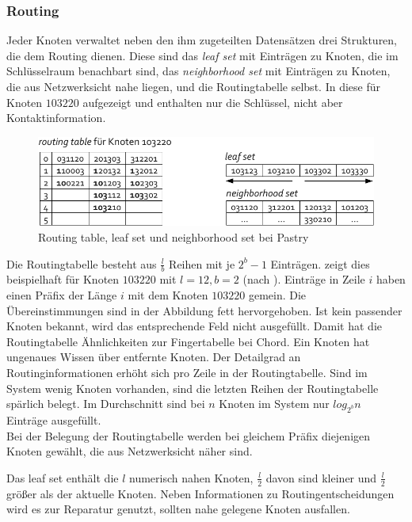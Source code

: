 \subsubsection{Routing}
Jeder Knoten verwaltet neben den ihm zugeteilten Datensätzen drei Strukturen, die dem Routing dienen. Diese sind das \emph{leaf set} mit Einträgen zu Knoten, die im Schlüsselraum benachbart sind, das \emph{neighborhood set} mit Einträgen zu Knoten, die aus Netzwerksicht nahe liegen, und die Routingtabelle selbst. In  diese für Knoten $103220$ aufgezeigt und enthalten nur die Schlüssel, nicht aber Kontaktinformation.

\begin{figure}[htbp]
\centering
\includegraphics{grafics/pastry_routing_table.pdf}
\caption{Routing table, leaf set und neighborhood set bei Pastry}
\label{fig:pastry_routing_table}
\end{figure}

Die Routingtabelle besteht aus $\frac{l}{b}$ Reihen mit je $2^b -1$ Einträgen.  zeigt dies beispielhaft für Knoten $103220$ mit $l=12, b=2$ (nach \cite{Goetz2005}). Einträge in Zeile $i$ haben einen Präfix der Länge $i$ mit dem Knoten $103220$ gemein. Die Übereinstimmungen sind in der Abbildung fett hervorgehoben. Ist kein passender Knoten bekannt, wird das entsprechende Feld nicht ausgefüllt. Damit hat die Routingtabelle Ähnlichkeiten zur Fingertabelle bei Chord. Ein Knoten hat ungenaues Wissen über entfernte Knoten. Der Detailgrad an Routinginformationen erhöht sich pro Zeile in der Routingtabelle. Sind im System wenig Knoten vorhanden, sind die letzten Reihen der Routingtabelle spärlich belegt. Im Durchschnitt sind bei $n$ Knoten im System nur $log_{2^b} n$ Einträge ausgefüllt.\\
Bei der Belegung der Routingtabelle werden bei gleichem Präfix diejenigen Knoten gewählt, die aus Netzwerksicht näher sind.

Das leaf set enthält die $l$ numerisch nahen Knoten, $\frac{l}{2}$ davon sind kleiner und $\frac{l}{2}$ größer als der aktuelle Knoten. Neben Informationen zu Routingentscheidungen wird es zur Reparatur genutzt, sollten nahe gelegene Knoten ausfallen.

